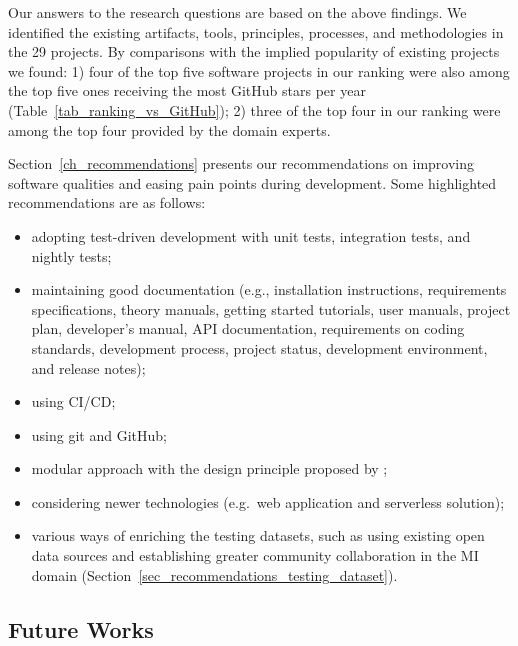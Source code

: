 \documentclass[final, 3p, times, authoryear]{elsarticle}
\begin{document}
Our answers to the research questions are based on the above findings. We
identified the existing artifacts, tools, principles, processes, and
methodologies in the 29 projects. By comparisons with the implied popularity of
existing projects we found: 1) four of the top five software projects in our
ranking were also among the top five ones receiving the most GitHub stars per
year (Table~\ref{tab_ranking_vs_GitHub}); 2) three of the top four in our
ranking were among the top four provided by the domain experts.

Section~\ref{ch_recommendations} presents our recommendations on improving
software qualities and easing pain points during development. Some highlighted
recommendations are as follows:
\begin{itemize}
\item adopting test-driven development with unit tests, integration tests, and
nightly tests;
\item maintaining good documentation (e.g., installation instructions,
requirements specifications, theory manuals, getting started tutorials, user
manuals, project plan, developer’s manual, API documentation, requirements on
coding standards, development process, project status, development environment,
and release notes);
\item using CI/CD;
\item using git and GitHub;
\item modular approach with the design principle proposed by
\citet{ParnasEtAl2000};
\item considering newer technologies (e.g.\ web application and serverless
solution);
\item various ways of enriching the testing datasets, such as using existing
open data sources and establishing greater community collaboration in the MI
domain (Section~\ref{sec_recommendations_testing_dataset}).
\end{itemize}

\subsection{Future Works}
\end{document}
